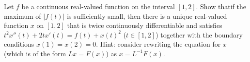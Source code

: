 Let $f$ be a continuous real-valued function on the interval
$[1,2]$. Show thatif the maximum of $|f(t)|$ is sufficiently small,
then there is a unique real-valued function $x$ on $[1,2]$ that is
twice continuously differentiable and satisfies
$t^2x''(t)+2tx'(t)=f(t)+x(t)^2$ ($t\in [1,2]$) together with the
boundary conditions $x(1)=x(2)=0$. Hint: consider rewriting the
equation for $x$ (which is of the form $Lx=F(x)$) as $x=L^{-1}F(x)$.
